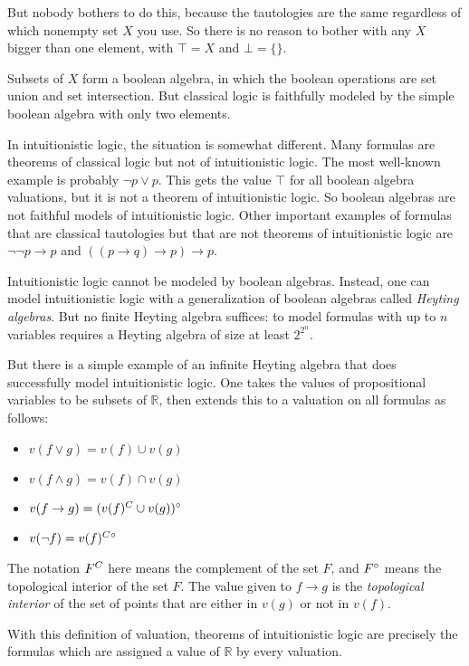 \documentclass{article}
\def\R{{\mathbb R}}
\def\comp#1{\smash{#1}^C\vphantom{#1}}
\def\inter#1{\smash{#1}^\circ\vphantom{#1}}
\def\intercomp#1{\inter{\comp{#1}}}
\def\imp{\rightarrow}           %
\begin{document}
But nobody bothers to do this, because the tautologies are the same
regardless of which nonempty set $X$ you use.  So there is no reason
to bother with any $X$ bigger than one element, with $\top = X$ and
$\bot = \{\}$.    

Subsets of $X$ form a boolean algebra, in which the boolean operations
are set union and set intersection.  But classical logic is faithfully
modeled by the simple boolean algebra with only two elements.

In intuitionistic logic, the situation is somewhat different.  Many
formulas are theorems of classical logic but not of intuitionistic
logic.  The most well-known example is probably $\neg p\vee p$.
This gets the value $\top$ for all boolean algebra valuations, but it
is not a theorem of intuitionistic logic.  So boolean algebras are not
faithful models of intuitionistic logic.  Other important examples of
formulas that are classical tautologies but that are not theorems of
intuitionistic logic are $\neg\neg p\imp p$ and $((p\imp q)\imp p)\imp
p$.

Intuitionistic logic cannot be modeled by boolean algebras.  Instead,
one can model intuitionistic logic with a generalization of boolean
algebras called {\em Heyting algebras\/}.  But no finite Heyting
algebra suffices: to model formulas with up to $n$ variables requires
a Heyting algebra of size at least $2^{2^n}$.

But there is a simple example of an infinite Heyting algebra that does
successfully model intuitionistic logic.  One takes the values of
propositional variables to be subsets of $\R$, then extends this to a
valuation on all formulas as follows:

\begin{itemize}
\item$ v(f\vee g) = v(f)\cup v(g)$
\item$ v(f\wedge g) = v(f)\cap v(g)$
\item$ v(f\imp g) = \inter{(\comp{v(f)} \cup v(g))}$
\item$ v(\neg f) = \intercomp{v(f)}$
\end{itemize}

The notation $\comp{F}$ here means the complement of the set
$F$, and $\inter{F}$ means the topological interior of the
set $F$.
The value given to
$f\imp g$ is the {\em topological interior\/} of the set of points
that are  either in $v(g)$ or not in $v(f)$.  

With this definition of valuation, theorems of intuitionistic logic
are precisely the formulas which are assigned a value of $\R$ by every
valuation. 
\end{document}
